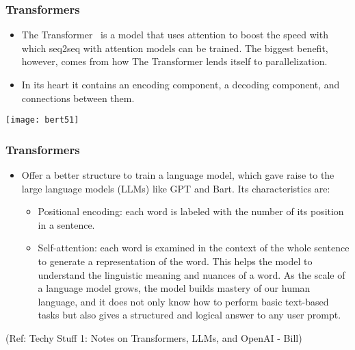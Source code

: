 


 


\begin{frame}[fragile]\frametitle{Transformers}


\begin{itemize}
\item The Transformer  is a model that uses attention to boost the speed with which seq2seq with attention models can be trained. The biggest benefit, however, comes from how The Transformer lends itself to parallelization. 
\item In its heart it contains an encoding component, a decoding component, and connections between them.
\end{itemize}	 

\begin{center}
\texttt{[image: bert51]}
\end{center}	

\end{frame}

\begin{frame}[fragile]\frametitle{Transformers}


\begin{itemize}
\item Offer a better structure to train a language model, which gave raise to the large language models (LLMs) like GPT and Bart. Its characteristics are:
\begin{itemize}
\item Positional encoding: each word is labeled with the number of its position in a sentence.
\item Self-attention: each word is examined in the context of the whole sentence to generate a representation of the word. This helps the model to understand the linguistic meaning and nuances of a word.
As the scale of a language model grows, the model builds mastery of our human language, and it does not only know how to perform basic text-based tasks but also gives a structured and logical answer to any user prompt.
\end{itemize}	 
\end{itemize}	 

{\tiny (Ref: Techy Stuff 1: Notes on Transformers, LLMs, and OpenAI - Bill)}
\end{frame}

